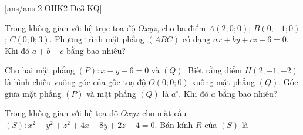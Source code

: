 [ans/ans-2-OHK2-De3-KQ]
\caukq
\begin{ex}%
	Trong không gian với hệ trục toạ độ $Oxyz$, cho ba điểm $A(2;0;0)$; $B(0;-1;0)$; $C(0;0;3)$. Phương trình mặt phẳng $(ABC)$ có dạng $ax+by+cz-6=0$. Khi đó $a+b+c$ bằng bao nhiêu?
\end{ex}
\begin{ex}%
	Cho hai mặt phẳng $(P)\colon x-y-6=0$ và $(Q)$. Biết rằng điểm $H(2 ;-1 ;-2)$ là hình chiếu vuông góc của gốc toạ độ $O(0;0;0)$ xuống mặt phẳng $(Q)$. Góc giữa mặt phẳng $(P)$ và mặt phẳng $(Q)$ là $a^\circ$. Khi đó $a$ bằng bao nhiêu?
\end{ex}
\begin{ex}%
	Trong không gian với hệ tọa độ $ Oxyz $ cho mặt cầu 
	$(S)\colon x^{2}+y^{2}+z^{2}+4 x-8 y+2 z-4=0$. Bán kính $R$ của $(S)$ là
\end{ex}
